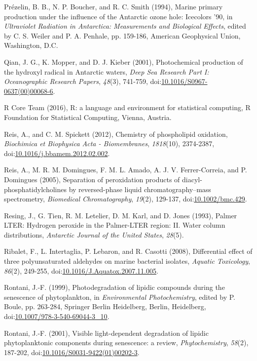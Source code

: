 \begin{singlespace}
{{Pr\'{e}zelin, B. B., N. P. Boucher, and R. C. Smith (1994), Marine primary production under the influence of the Antarctic ozone hole: Icecolors '90, in \emph{Ultraviolet Radiation in Antarctica: Measurements and Biological Effects}, edited by C. S. Weiler and P. A. Penhale, pp. 159-186, American Geophysical Union, Washington, D.C.

Qian, J. G., K. Mopper, and D. J. Kieber (2001), Photochemical production of the hydroxyl radical in Antarctic waters, \emph{Deep Sea Research Part I: Oceanographic Research Papers}, \emph{48}(3), 741-759, doi:\href{http://dx.doi.org/10.1016/S0967-0637(00)00068-6}{10.1016/S0967-0637(00)00068-6}.

R Core Team (2016), R: a language and environment for statistical computing, R Foundation for Statistical Computing, Vienna, Austria.

Reis, A., and C. M. Spickett (2012), Chemistry of phospholipid oxidation, \emph{Biochimica et Biophysica Acta - Biomembranes}, \emph{1818}(10), 2374-2387, doi:\href{http://dx.doi.org/10.1016/j.bbamem.2012.02.002}{10.1016/j.bbamem.2012.02.002}.

Reis, A., M. R. M. Domingues, F. M. L. Amado, A. J. V. Ferrer-Correia, and P. Domingues (2005), Separation of peroxidation products of diacyl-phosphatidylcholines by reversed-phase liquid chromatography--mass spectrometry, \emph{Biomedical Chromatography}, \emph{19}(2), 129-137, doi:\href{http://dx.doi.org/10.1002/bmc.429}{10.1002/bmc.429}.

Resing, J., G. Tien, R. M. Letelier, D. M. Karl, and D. Jones (1993), Palmer LTER: Hydrogen peroxide in the Palmer-LTER region: II. Water column distributions, \emph{Antarctic Journal of the United States}, \emph{28}(5).

Ribalet, F., L. Intertaglia, P. Lebaron, and R. Casotti (2008), Differential effect of three polyunsaturated aldehydes on marine bacterial isolates, \emph{Aquatic Toxicology}, \emph{86}(2), 249-255, doi:\href{http://dx.doi.org/10.1016/J.Aquatox.2007.11.005}{10.1016/J.Aquatox.2007.11.005}.

Rontani, J.-F. (1999), Photodegradation of lipidic compounds during the senescence of phytoplankton, in \emph{Environmental Photochemistry}, edited by P. Boule, pp. 263-284, Springer Berlin Heidelberg, Berlin, Heidelberg, doi:\href{http://dx.doi.org/10.1007/978-3-540-69044-3_10}{10.1007/978-3-540-69044-3\_10}.

Rontani, J.-F. (2001), Visible light-dependent degradation of lipidic phytoplanktonic components during senescence: a review, \emph{Phytochemistry}, \emph{58}(2), 187-202, doi:\href{http://dx.doi.org/10.1016/S0031-9422(01)00202-3}{10.1016/S0031-9422(01)00202-3}.

}}
\end{singlespace}
